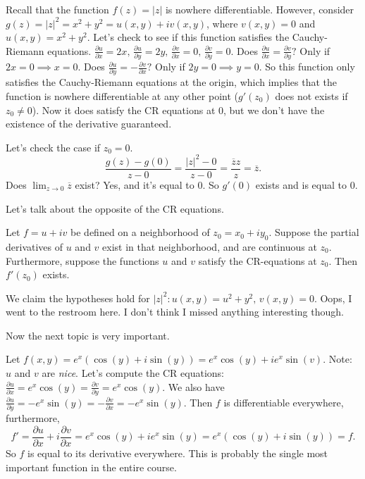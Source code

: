 \begin{example}
    Recall that the function $f(z)=|z|$ is nowhere differentiable. However, consider $g(z)=|z|^2=x^2+y^2=u(x,y)+iv(x,y)$, where $v(x,y)=0$ and $u(x,y)=x^2+y^2$. Let's check to see if this function satisfies the Cauchy-Riemann equations. $\frac{\partial u}{\partial x}=2x,\, \frac{\partial u}{\partial y}=2y, \, \frac{\partial v}{\partial x}=0,\, \frac{\partial v}{\partial y}=0$. Does $\frac{\partial u}{\partial x}=\frac{\partial v}{\partial y}?$ Only if $2x=0 \implies x=0$. Does $\frac{\partial u}{\partial y}=-\frac{\partial v}{\partial x}?$ Only if $2y=0\implies y=0$. So this function only satisfies the Cauchy-Riemann equations at the origin, which implies that the function is nowhere differentiable at any other point ($g'(z_0)$ does not exists if $z_0\neq 0$). Now it does satisfy the CR equations at $0$, but we don't have the existence of the derivative guaranteed.

    Let's check the case if $z_0=0$. \[
        \frac{g(z)-g(0)}{z-0}=\frac{|z|^2-0}{z-0}=\frac{\overline{z}z}{z}=\overline{z}.
    \] Does $\lim_{z\to 0}\overline{z}$ exist? Yes, and it's equal to $0$. So $g'(0)$ exists and is equal to $0$.
\end{example}
Let's talk about the opposite of the CR equations.
\begin{theorem}
    Let $f=u+iv$ be defined on a neighborhood of $z_0=x_0+iy_0$. Suppose the partial derivatives of $u$ and $v$ exist in that neighborhood, and are continuous at $z_0$. Furthermore, suppose the functions $u$ and $v$ satisfy the CR-equations at $z_0$. Then $f'(z_0)$ exists.
\end{theorem}
\begin{note}
    We claim the hypotheses hold for $|z|^2: u(x,y)=u^2+y^2,\, v(x,y)=0$. Oops, I went to the restroom here. I don't think I missed anything interesting though.
\end{note}
Now the next topic is very important. 
\begin{example}
    Let $f(x,y)=e^{x}(\cos(y)+i\sin(y))=e^{x}\cos(y)+ie^{x}\sin(v)$. Note: $u$ and $v$ are \emph{nice}. Let's compute the CR equations: $\frac{\partial u}{\partial x}=e^{x}\cos(y)=\frac{\partial v}{\partial y}=e^{x}\cos(y)$. We also have $\frac{\partial u}{\partial y}=-e^{x}\sin(y)=-\frac{\partial v}{\partial x}=-e^{x}\sin(y)$. Then $f$ is differentiable everywhere, furthermore, 
    \[
    f'=\frac{\partial u}{\partial x}+i \frac{\partial v}{\partial x}=e^{x}\cos(y)+ie^{x}\sin(y)=e^{x}(\cos(y)+i\sin(y))=f.
\] So $f$ is equal to its derivative everywhere. This is probably the single most important function in the entire course. 
\end{example}
